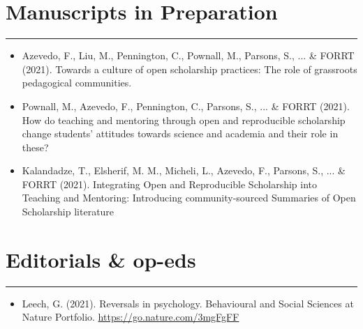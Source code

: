 \documentclass[letterpaper]{article}
\begin{document}
\section*{\color{Brown}Manuscripts in Preparation}
\vspace{-.5em}
\hrule
\vspace{1em}
\begin{itemize}
\vspace{0.25em}

\item[]{\noindent Azevedo, F., Liu, M., Pennington, C., Pownall, M.,  Parsons, S., ... \& FORRT (2021). Towards a culture of open scholarship practices: The role of grassroots pedagogical communities.} 

\item[]{\noindent Pownall, M., Azevedo, F., Pennington, C., Parsons, S., ... \& FORRT (2021). How do teaching and mentoring through open and reproducible scholarship change students' attitudes towards science and academia and their role in these?}

\item[]{\noindent Kalandadze, T., Elsherif, M. M.,  Micheli, L., Azevedo, F., Parsons, S., ... \& FORRT (2021). Integrating Open and Reproducible Scholarship into Teaching and Mentoring: Introducing community-sourced Summaries of Open Scholarship literature}

\end{itemize}










\section*{\color{Brown}Editorials \& op-eds}
\vspace{-.5em}
\hrule
\vspace{1em}
\begin{itemize}
\vspace{0.25em}

\item[]{\noindent Leech, G. (2021). Reversals in psychology. Behavioural and Social Sciences at Nature Portfolio. \href{https://go.nature.com/3mgFgFF}{\color{BlueViolet}https://go.nature.com/3mgFgFF}}
 

\end{itemize}
\end{document}
